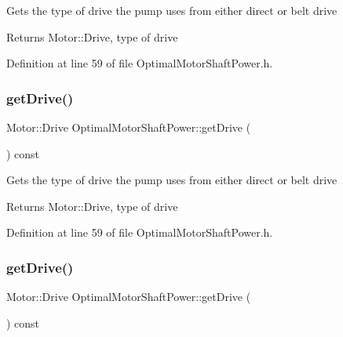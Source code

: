 Gets the type of drive the pump uses from either direct or belt drive \begin{DoxyReturn}{Returns}
Motor\+::\+Drive, type of drive 
\end{DoxyReturn}


Definition at line 59 of file Optimal\+Motor\+Shaft\+Power.\+h.

\mbox{\label{class_optimal_motor_shaft_power_a3cc369285d8b3582fcd8c44e5a1c37c8}} 
\subsubsection{\texorpdfstring{get\+Drive()}{getDrive()}\hspace{0.1cm}{\footnotesize\ttfamily [2/3]}}
{\footnotesize\ttfamily Motor\+::\+Drive Optimal\+Motor\+Shaft\+Power\+::get\+Drive (\begin{DoxyParamCaption}{ }\end{DoxyParamCaption}) const\hspace{0.3cm}{\ttfamily [inline]}}

Gets the type of drive the pump uses from either direct or belt drive \begin{DoxyReturn}{Returns}
Motor\+::\+Drive, type of drive 
\end{DoxyReturn}


Definition at line 59 of file Optimal\+Motor\+Shaft\+Power.\+h.

\mbox{\label{class_optimal_motor_shaft_power_a3cc369285d8b3582fcd8c44e5a1c37c8}} 
\subsubsection{\texorpdfstring{get\+Drive()}{getDrive()}\hspace{0.1cm}{\footnotesize\ttfamily [3/3]}}
{\footnotesize\ttfamily Motor\+::\+Drive Optimal\+Motor\+Shaft\+Power\+::get\+Drive (\begin{DoxyParamCaption}{ }\end{DoxyParamCaption}) const\hspace{0.3cm}{\ttfamily [inline]}}

